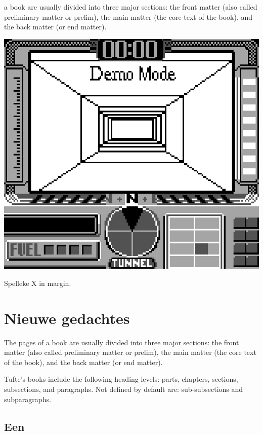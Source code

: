 \documentclass[
  english,
  symmetric,justified,marginals=raggedouter]{tufte-book}
\begin{document}
 a book are usually divided into three major sections: the
front matter (also called preliminary matter or prelim), the main matter
(the core text of the book), and the back matter (or end matter).

\begin{marginfigure}%
  \includegraphics[width=\linewidth]{x.png}
  \caption{Spelleke X in margin.}
  \label{fig:marginfig}
\end{marginfigure}

\hypertarget{nieuwe-gedachtes}{%
\section{Nieuwe gedachtes}\label{nieuwe-gedachtes}}

The pages of a book are usually divided into three major sections: the
front matter (also called preliminary matter or prelim), the main matter
(the core text of the book), and the back matter (or end matter).

Tufte's books include the following heading levels: parts,
chapters, sections, subsections, and paragraphs. Not defined by
default are: sub-subsections and subparagraphs.

\hypertarget{een}{%
\subsection{Een}\label{een}}
\end{document}
